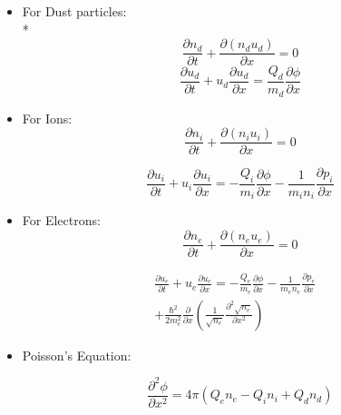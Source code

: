 \documentclass[journal]{IEEEtran}
\begin{document}
\begin{itemize}
		\item{For Dust particles}:
		\\*
		\begin{equation}
				\frac{\partial n_d}{\partial t} + \frac{\partial (n_du_d)}{\partial x} = 0	
		\end{equation}
		\begin{equation}
			\frac{\partial u_d}{\partial t} + u_d \frac{\partial u_d}{\partial x} = \frac{Q_d}{m_d}\frac{\partial \phi}{\partial x}
		\end{equation}		
		
		\item {For Ions}:
		\begin{equation}
			\frac{\partial n_i}{\partial t} + \frac{\partial (n_iu_i)}{\partial x} = 0		
		\end{equation}
		
		\begin{equation}
			\frac{\partial u_i}{\partial t} + u_i \frac{\partial u_i}{\partial x} = -\frac{Q_i}{m_i} \frac{\partial \phi}{\partial x} - \frac{1}{m_in_i} \frac{\partial p_i}{\partial x}
		\end{equation}		
		
		\item {For Electrons}:
		\begin{equation}
			\frac{\partial n_e}{\partial t} + \frac{\partial (n_eu_e)}{\partial x} = 0
		\end{equation}
		
		
		\begin{equation}
		\begin{split}
			\frac{\partial u_e}{\partial t} + u_e \frac{\partial u_e}{\partial x} = -\frac{Q_e}{m_e} \frac{\partial \phi}{\partial x} - \frac{1}{m_en_e} \frac{\partial p_e}{\partial x} &\\
			+ \frac{\hbar^2}{2m_e^2} \frac{\partial}{\partial x} (\frac{1}{\sqrt{n_e}}\frac{\partial^2 \sqrt{n_e}}{\partial x^2})&
		\end{split}
		\end{equation}
		
		\item {Poisson's Equation:}
		
		\begin{equation}
			\frac{\partial^2 \phi}{\partial x^2} = 4\pi(Q_en_e - Q_in_i + Q_dn_d)
		\end{equation}	
		
	\end{itemize}
\end{document}
